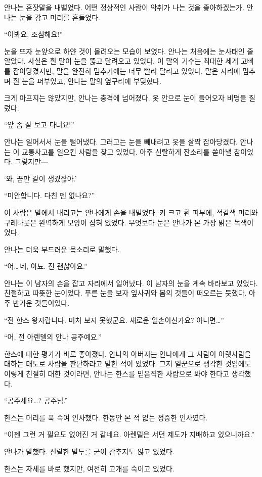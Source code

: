 안나는 혼잣말을 내뱉었다. 어떤 정상적인 사람이 악취가 나는 것을 좋아하겠는가. 안나는 눈을 감고 머리를 흔들었다.

``이봐요, 조심해요!''

눈을 뜨자 눈앞으로 하얀 것이 몰려오는 모습이 보였다. 안나는 처음에는 눈사태인 줄 알았다. 사실은 흰 말이 눈을 뚫고 달려오고 있었다. 이 말의 기수는 최대한 세게 고삐를 잡아당겼지만, 말을 완전히 멈추기에는 너무 빨리 달리고 있었다. 말은 자리에 멈추며 흰 눈을 퍼부었고, 안나는 말의 옆구리에 부딪혔다.

크게 아프지는 않았지만, 안나는 충격에 넘어졌다. 옷 안으로 눈이 들어오자 비명을 질렀다.

``앞 좀 잘 보고 다녀요!''

안나는 일어서서 눈을 털어냈다. 그러고는 눈을 빼내려고 옷을 살짝 잡아당겼다. 안나는 이 교통사고를 일으킨 사람을 찾고 있었다. 아주 신랄하게 잔소리를 쏟아낼 참이었다. 그렇지만—

`와, 꿈만 같이 생겼잖아.'

``미안합니다. 다친 덴 없나요?''

이 사람은 말에서 내리고는 안나에게 손을 내밀었다. 키 크고 흰 피부에, 적갈색 머리와 구레나룻은 완벽하게 모양이 잡혀 있었다. 무엇보다 눈은 안나가 본 가장 밝은 녹색이었다.

안나는 더욱 부드러운 목소리로 말했다.

``어\ldots\,네, 아뇨. 전 괜찮아요.''

안나는 이 남자의 손을 잡고 자리에서 일어났다. 이 남자의 눈을 계속 바라보고 있었다. 친절하고 따뜻한 눈이었다. 푸른 눈을 보자 잎사귀와 봄의 것들이 떠오르는 듯했다. 아주 반가운 것들이었다.

``전 한스 왕자랍니다. 미처 보지 못했군요. 새로운 일손이신가요? 아니면\ldots''

``어, 전 아렌델의 안나 공주예요.''

한스에 대한 평가가 바로 좋아졌다. 안나의 아버지는 안나에게 그 사람이 아랫사람을 대하는 태도로 사람을 판단하라고 말한 적이 있었다. 그저 일꾼으로 생각한 것임에도 이렇게 친절히 대한 것이라면, 안나는 한스를 믿음직한 사람으로 봐야 한다고 생각했다.

``공주세요\ldots? 공주님.''

한스는 머리를 푹 숙여 인사했다. 한동안 본 적 없는 정중한 인사였다.

``이젠 그런 거 필요도 없어진 거 같네요. 아렌델은 서던 제도가 지배하고 있으니까요.''

안나가 말했다. 신랄한 말투를 굳이 감추지도 않고 있었다.

한스는 자세를 바로 했지만, 여전히 고개를 숙이고 있었다.

